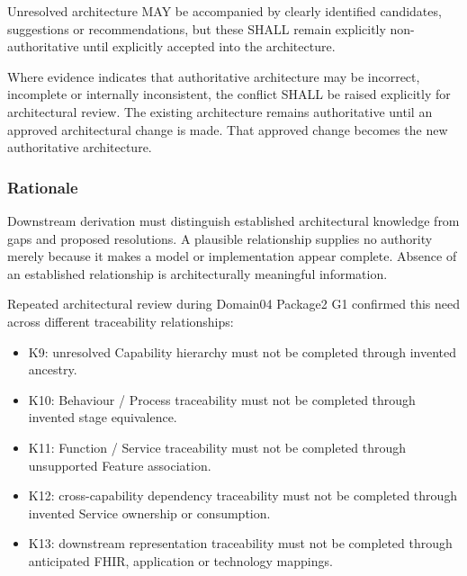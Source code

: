 \label{rad:axioms:786}

Unresolved architecture MAY be accompanied by clearly identified candidates, suggestions or recommendations, but these SHALL remain explicitly non-authoritative until explicitly accepted into the architecture.

\label{rad:axioms:791}

Where evidence indicates that authoritative architecture may be incorrect, incomplete or internally inconsistent, the conflict SHALL be raised explicitly for architectural review. The existing architecture remains authoritative until an approved architectural change is made. That approved change becomes the new authoritative architecture.

\label{rad:axioms:797}
\subsubsection*{Rationale}
\label{rad:axioms:799}

Downstream derivation must distinguish established architectural knowledge from gaps and proposed resolutions. A plausible relationship supplies no authority merely because it makes a model or implementation appear complete. Absence of an established relationship is architecturally meaningful information.

\label{rad:axioms:805}

Repeated architectural review during Domain04 Package2 G1 confirmed this need across different traceability relationships:

\label{rad:axioms:808}

\begin{itemize}

\item
K9: unresolved Capability hierarchy must not be completed through invented ancestry.



\item
K10: Behaviour /\allowbreak{} Process traceability must not be completed through invented stage equivalence.



\item
K11: Function /\allowbreak{} Service traceability must not be completed through unsupported Feature association.



\item
K12: cross-capability dependency traceability must not be completed through invented Service ownership or consumption.



\item
K13: downstream representation traceability must not be completed through anticipated FHIR, application or technology mappings.



\end{itemize}
\label{rad:axioms:819}

